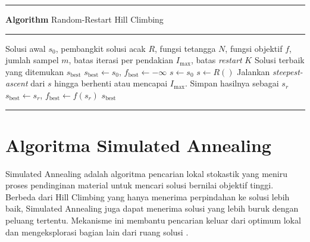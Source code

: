 \begingroup
\setlength{\parskip}{0pt}
\begin{list}{}{\setlength{\leftmargin}{0.1\linewidth}\setlength{\rightmargin}{0.1\linewidth}\setlength{\labelsep}{0pt}\setlength{\topsep}{0pt}\setlength{\partopsep}{0pt}\setlength{\parsep}{0pt}\setlength{\itemsep}{0pt}}\item[]
\noindent\rule{\linewidth}{0.8pt}\par\vspace{1pt}
\noindent{}\textbf{Algorithm \thealgorithm} Random-Restart Hill Climbing\label{alg:random-restart-hill-climbing}\par
\vspace{1pt}\noindent\rule{\linewidth}{0.4pt}\par\vspace{1pt}
\begin{algorithmic}
    \REQUIRE Solusi awal $s_0$, pembangkit solusi acak $R$, fungsi tetangga $N$, fungsi objektif $f$, jumlah sampel $m$, batas iterasi per pendakian $I_{\max}$, batas \textit{restart} $K$
    \ENSURE Solusi terbaik yang ditemukan $s_{\text{best}}$
    \STATE $s_{\text{best}} \gets s_0$, $f_{\text{best}} \gets -\infty$
    \STATE $s \gets s_0$
    \ELSE
    \STATE $s \gets R()$
    \ENDIF
    \STATE Jalankan \textit{steepest-ascent} dari $s$ hingga berhenti atau mencapai $I_{\max}$. Simpan hasilnya sebagai $s_r$
    \STATE $s_{\text{best}} \gets s_r$, $f_{\text{best}} \gets f(s_r)$
    \ENDIF
    \ENDFOR
    \RETURN $s_{\text{best}}$
\end{algorithmic}
\par\vspace{1pt}\noindent\rule{\linewidth}{0.8pt}
\end{list}
\endgroup

\section{Algoritma Simulated Annealing}

Simulated Annealing adalah algoritma pencarian lokal stokastik yang meniru proses pendinginan material untuk mencari solusi bernilai objektif tinggi. Berbeda dari Hill Climbing yang hanya menerima perpindahan ke solusi lebih baik, Simulated Annealing juga dapat menerima solusi yang lebih buruk dengan peluang tertentu. Mekanisme ini membantu pencarian keluar dari optimum lokal dan mengeksplorasi bagian lain dari ruang solusi \cite{russell2021artificial,kirkpatrick1983optimization}.

